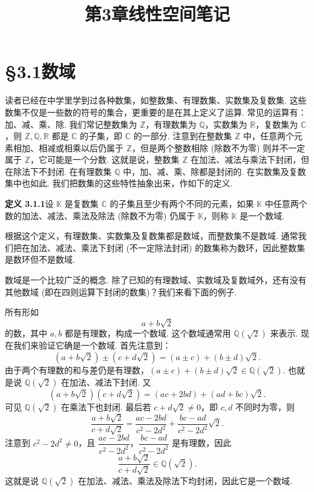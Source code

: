 \documentclass[UTF8,12pt,a4paper,fontset=fandol]{ctexart}
\title{第3章\quad 线性空间笔记}
\author{}
\date{}
\begin{document}
\maketitle

\section*{§3.1\quad 数域}

读者已经在中学里学到过各种数集，如整数集、有理数集、实数集及复数集. 这些数集不仅是一些数的符号的集合，更重要的是在其上定义了运算. 常见的运算有：加、减、乘、除. 我们常记整数集为 $\mathbb{Z}$，有理数集为 $\mathbb{Q}$，实数集为 $\mathbb{R}$，复数集为 $\mathbb{C}$，则 $\mathbb{Z},\mathbb{Q},\mathbb{R}$ 都是 $\mathbb{C}$ 的子集，即 $\mathbb{C}$ 的一部分. 注意到在整数集 $\mathbb{Z}$ 中，任意两个元素相加、相减或相乘以后仍属于 $\mathbb{Z}$，但是两个整数相除 (除数不为零) 则并不一定属于 $\mathbb{Z}$，它可能是一个分数. 这就是说，整数集 $\mathbb{Z}$ 在加法、减法与乘法下封闭，但在除法下不封闭. 在有理数集 $\mathbb{Q}$ 中，加、减、乘、除都是封闭的. 在实数集及复数集中也如此. 我们把数集的这些特性抽象出来，作如下的定义.

\noindent\textbf{定义 3.1.1}\quad 设 $\mathbb{K}$ 是复数集 $\mathbb{C}$ 的子集且至少有两个不同的元素，如果 $\mathbb{K}$ 中任意两个数的加法、减法、乘法及除法 (除数不为零) 仍属于 $\mathbb{K}$，则称 $\mathbb{K}$ 是一个数域.

根据这个定义，有理数集、实数集及复数集都是数域，而整数集不是数域. 通常我们把在加法、减法、乘法下封闭 (不一定除法封闭) 的数集称为数环，因此整数集是数环但不是数域.

数域是一个比较广泛的概念. 除了已知的有理数域、实数域及复数域外，还有没有其他数域 (即在四则运算下封闭的数集)？我们来看下面的例子.

所有形如
\[
a+b\sqrt{2}
\]
的数，其中 $a,b$ 都是有理数，构成一个数域. 这个数域通常用 $\mathbb{Q}(\sqrt{2})$ 来表示. 现在我们来验证它确是一个数域. 首先注意到：
\[
(a+b\sqrt{2})\pm(c+d\sqrt{2})=(a\pm c)+(b\pm d)\sqrt{2}.
\]
由于两个有理数的和与差仍是有理数，$(a\pm c)+(b\pm d)\sqrt{2}\in\mathbb{Q}(\sqrt{2})$. 也就是说 $\mathbb{Q}(\sqrt{2})$ 在加法、减法下封闭. 又
\[
(a+b\sqrt{2})(c+d\sqrt{2})=(ac+2bd)+(ad+bc)\sqrt{2}.
\]
可见 $\mathbb{Q}(\sqrt{2})$ 在乘法下也封闭. 最后若 $c+d\sqrt{2}\neq 0$，即 $c,d$ 不同时为零，则
\[
\frac{a+b\sqrt{2}}{c+d\sqrt{2}}
=\frac{ac-2bd}{c^2-2d^2}+\frac{bc-ad}{c^2-2d^2}\sqrt{2}.
\]
注意到 $c^2-2d^2\neq 0$，且 $\dfrac{ac-2bd}{c^2-2d^2}$，$\dfrac{bc-ad}{c^2-2d^2}$ 是有理数，因此
\[
\frac{a+b\sqrt{2}}{c+d\sqrt{2}}\in\mathbb{Q}(\sqrt{2}).
\]
这就是说 $\mathbb{Q}(\sqrt{2})$ 在加法、减法、乘法及除法下均封闭，因此它是一个数域.
\end{document}
